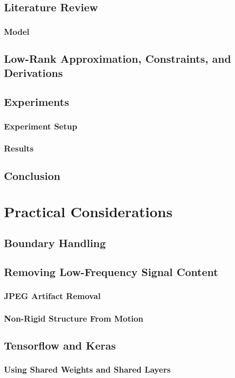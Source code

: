 \documentclass{article}
\begin{document}
\subsection{Literature Review}
\subsubsection{Model}
\subsection{Low-Rank Approximation, Constraints, and Derivations}
\subsection{Experiments}
\subsubsection{Experiment Setup}
\subsubsection{Results}
\subsection{Conclusion}

\section{Practical Considerations}
\subsection{Boundary Handling}
\subsection{Removing Low-Frequency Signal Content}
\subsubsection{JPEG Artifact Removal}
\subsubsection{Non-Rigid Structure From Motion}
\subsection{Tensorflow and Keras}
\subsubsection{Using Shared Weights and Shared Layers}
\end{document}
